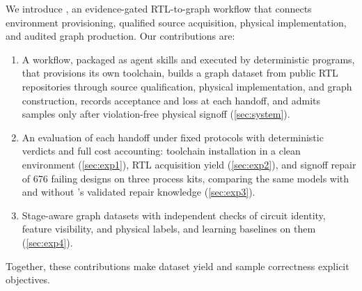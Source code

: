 We introduce \R, an evidence-gated RTL-to-graph workflow that connects environment provisioning,
qualified source acquisition, physical implementation, and audited graph production. Our
contributions are:
\begin{enumerate}
  \item A workflow, packaged as agent skills and executed by deterministic programs, that provisions
        its own toolchain, builds a graph dataset from public RTL repositories through source
        qualification, physical implementation, and graph construction, records acceptance and loss
        at each handoff, and admits samples only after violation-free physical signoff
        (\cref{sec:system}).
  \item An evaluation of each handoff under fixed protocols with deterministic verdicts and full cost
        accounting: toolchain installation in a clean environment (\cref{sec:exp1}), RTL acquisition
        yield (\cref{sec:exp2}), and signoff repair of 676 failing designs on three process kits,
        comparing the same models with and without \R's validated repair knowledge
        (\cref{sec:exp3}).
  \item Stage-aware graph datasets with independent checks of circuit identity, feature visibility,
        and physical labels, and learning baselines on them (\cref{sec:exp4}).
\end{enumerate}
Together, these contributions make dataset yield and sample correctness explicit objectives.
